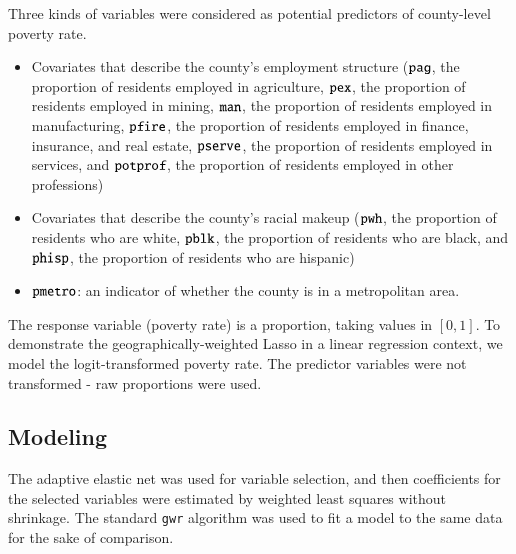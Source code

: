 \documentclass[authoryear, review, 11pt]{elsarticle}
\begin{document}
	Three kinds of variables  were considered as potential predictors of county-level poverty rate.
	\begin{itemize}
		\item Covariates that describe the county's employment structure ($\verb!pag!$, the proportion of residents employed in agriculture, $\verb!pex!$, the proportion of residents employed in mining, $\verb!man!$, the proportion of residents employed in manufacturing, $\verb!pfire!$, the proportion of residents employed in finance, insurance, and real estate, $\verb!pserve!$, the proportion of residents employed in services, and $\verb!potprof!$, the proportion of residents employed in other professions)\\
		\item Covariates that describe the county's racial makeup ($\verb!pwh!$, the proportion of residents who are white, $\verb!pblk!$, the proportion of residents who are black, and $\verb!phisp!$, the proportion of residents who are hispanic)\\
		\item $\verb!pmetro!$: an indicator of whether the county is in a metropolitan area.
	\end{itemize}
	The response variable (poverty rate) is a proportion, taking values in $[0,1]$. To demonstrate the geographically-weighted Lasso in a linear regression context, we model the logit-transformed poverty rate. The predictor variables were not transformed - raw proportions were used.
	
	\subsection{Modeling}	
	The adaptive elastic net was used for variable selection, and then coefficients for the selected variables were estimated by weighted least squares without shrinkage. The standard {\tt gwr} algorithm was used to fit a model to the same data for the sake of comparison.
	
\end{document}
